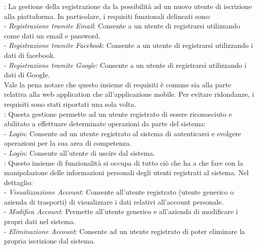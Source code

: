 : La gestione della registrazione da la possibilità ad un nuovo utente di iscrizione alla piattaforma. In particolare, i requisiti funzionali delineati sono:\\

 - \emph{Registrazione tramite Email}: Consente a un utente di registrarsi utilizzando come dati un email e password.\\
 - \emph{Registrazione tramite Facebook}: Consente a un utente di registrarsi utilizzando i dati di facebook.\\
 - \emph{Registrazione tramite Google}: Consente a un utente di registrarsi utilizzando i dati di Google.\\

Vale la pena notare che questo insieme di requisiti \`{e} comune sia alla parte relativa alla web application che all'applicazione mobile. Per evitare ridondanze, i requisiti sono stati riportati una sola volta.\\

: Questa gestione permette ad un utente registrato di essere riconosciuto e abilitato a effettuare determinate operazioni da parte del sistema:\\

 - \emph{Login}: Consente ad un utente registrato al sistema di autenticarsi e svolgere operazioni per la sua area di competenza.\\
 - \emph{Login}: Consente all’utente di uscire dal sistema.\\

: Questo insieme di funzionalit\`{a} si occupa di tutto ciò che ha a che fare con la manipolazione delle informazioni personali degli utenti registrati al sistema. Nel dettaglio:\\

 - \emph{Visualizzazione Account}: Consente all'utente registrato (utente generico o azienda di trasporti) di visualizzare i dati relativi all’account personale.\\
 - \emph{Modifica Account}: Permette all’utente generico e all’azienda di modificare i propri dati nel sistema.\\
 - \emph{Eliminazione Account}: Consente ad un utente registrato di poter eliminare la propria iscrizione dal sistema.\\

